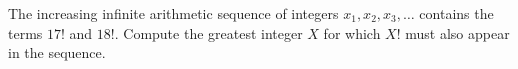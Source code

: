 The increasing infinite arithmetic sequence of integers $x_1,x_2,x_3,\ldots$ contains the terms $17!$ and $18!$. Compute the greatest integer $X$ for which $X!$ must also appear in the sequence.